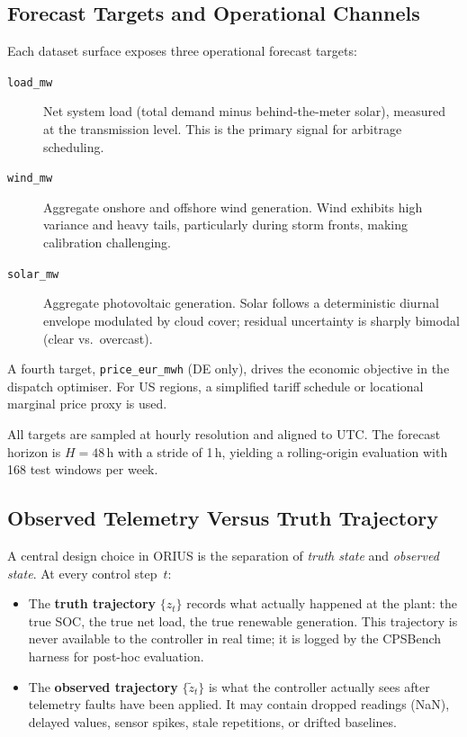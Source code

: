 \subsection{Forecast Targets and Operational Channels}

Each dataset surface exposes three operational forecast targets:

\begin{description}
  \item[\texttt{load\_mw}] Net system load (total demand minus behind-the-meter
    solar), measured at the transmission level.  This is the primary signal for
    arbitrage scheduling.
  \item[\texttt{wind\_mw}] Aggregate onshore and offshore wind generation.
    Wind exhibits high variance and heavy tails, particularly during storm
    fronts, making calibration challenging.
  \item[\texttt{solar\_mw}] Aggregate photovoltaic generation.  Solar follows a
    deterministic diurnal envelope modulated by cloud cover; residual
    uncertainty is sharply bimodal (clear vs.\ overcast).
\end{description}

A fourth target, \texttt{price\_eur\_mwh} (DE only), drives the economic
objective in the dispatch optimiser.  For US regions, a simplified tariff
schedule or locational marginal price proxy is used.

All targets are sampled at hourly resolution and aligned to UTC.  The forecast
horizon is $H = 48$\,h with a stride of 1\,h, yielding a rolling-origin
evaluation with 168 test windows per week.

\subsection{Observed Telemetry Versus Truth Trajectory}

A central design choice in ORIUS is the separation of \emph{truth state}
and \emph{observed state}.  At every control step~$t$:

\begin{itemize}
  \item The \textbf{truth trajectory} $\{z_t\}$ records what actually happened
    at the plant: the true SOC, the true net load, the true renewable
    generation.  This trajectory is never available to the controller in real
    time; it is logged by the CPSBench harness for post-hoc evaluation.
  \item The \textbf{observed trajectory} $\{\tilde{z}_t\}$ is what the
    controller actually sees after telemetry faults have been applied.  It may
    contain dropped readings (NaN), delayed values, sensor spikes, stale
    repetitions, or drifted baselines.
\end{itemize}

